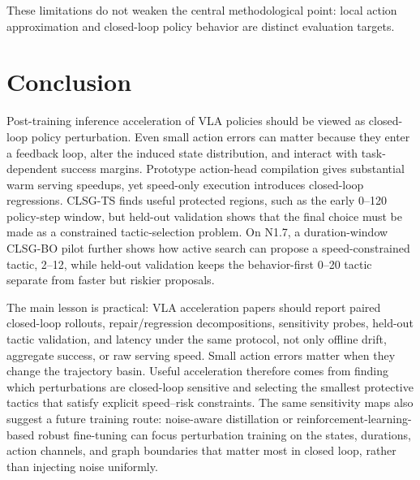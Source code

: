 \documentclass[10pt]{article}
\begin{document}
These limitations do not weaken the central methodological point: local action approximation and closed-loop policy behavior are distinct evaluation targets.

\section{Conclusion}

Post-training inference acceleration of VLA policies should be viewed as closed-loop policy perturbation. Even small action errors can matter because they enter a feedback loop, alter the induced state distribution, and interact with task-dependent success margins. Prototype action-head compilation gives substantial warm serving speedups, yet speed-only execution introduces closed-loop regressions. CLSG-TS finds useful protected regions, such as the early 0--120 policy-step window, but held-out validation shows that the final choice must be made as a constrained tactic-selection problem. On N1.7, a duration-window CLSG-BO pilot further shows how active search can propose a speed-constrained tactic, 2--12, while held-out validation keeps the behavior-first 0--20 tactic separate from faster but riskier proposals.

The main lesson is practical: VLA acceleration papers should report paired closed-loop rollouts, repair/regression decompositions, sensitivity probes, held-out tactic validation, and latency under the same protocol, not only offline drift, aggregate success, or raw serving speed. Small action errors matter when they change the trajectory basin. Useful acceleration therefore comes from finding which perturbations are closed-loop sensitive and selecting the smallest protective tactics that satisfy explicit speed--risk constraints. The same sensitivity maps also suggest a future training route: noise-aware distillation or reinforcement-learning-based robust fine-tuning can focus perturbation training on the states, durations, action channels, and graph boundaries that matter most in closed loop, rather than injecting noise uniformly.

{\small


}
\end{document}
